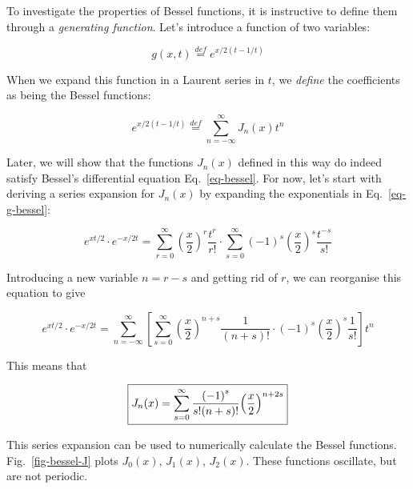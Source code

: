 To investigate the properties of Bessel functions, it is instructive to define them through a \emph{generating function}. Let's introduce a function of two variables:

\begin{equation}
g(x,t) \stackrel{def}{=} e^{x/2(t-1/t)} \label{eq-gen-bessel}
\end{equation}

When we expand this function in a Laurent series in $t$, we \emph{define} the coefficients as being the Bessel functions:

\begin{equation}
e^{x/2(t-1/t)}  \stackrel{def}{=} \sum_{n = - \infty}^{\infty} J_n(x)t^n \label{eq-g-bessel}
\end{equation}  

Later, we will show that the functions $J_n(x)$ defined in this way do indeed satisfy Bessel's differential equation Eq.~\ref{eq-bessel}. For now, let's start with deriving a series expansion for $J_n(x)$ by expanding the exponentials in Eq.~\ref{eq-g-bessel}:

\begin{equation}
e^{xt/2} \cdot e^{-x/2t} = \sum_{r = 0}^{\infty} {\left(\frac{x}{2}\right)}^r \frac{t^r}{r!} \cdot \sum_{s = 0}^{\infty} {(-1)}^s { \left(\frac{x}{2}\right)}^s \frac{t^{-s}}{s!}
\end{equation} 

Introducing a new variable $n = r - s$ and getting rid of $r$, we can reorganise this equation to give

\begin{equation}
e^{xt/2} \cdot e^{-x/2t} = \sum_{n = -\infty}^{\infty} \left[ \sum_{s = 0}^{\infty} {\left(\frac{x}{2}\right)}^{n+s} \frac{1}{(n+s)!} \cdot (-1)^s {\left(\frac{x}{2}\right)}^{s} \frac{1}{s!} \right] t^n
\end{equation} 

This means that

\begin{equation}
\fbox{$\displaystyle
J_n(x) = \sum_{s = 0}^{\infty} \frac {{(-1)}^s}{s!(n+s)!} {\left(\frac{x}{2}\right)}^{n+2s} \label{eq-bessel-series}
$}
\end{equation} 

This series expansion can be used to numerically calculate the Bessel functions. Fig.~\ref{fig-bessel-J} plots $J_0(x)$, $J_1(x)$, $J_2(x)$. These functions oscillate, but are not periodic.

